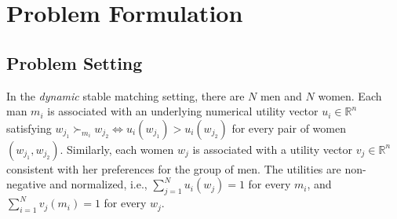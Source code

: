 \section{Problem Formulation}
\subsection{Problem Setting}

In the \textit{dynamic} stable matching setting, there are $N$ men and $N$ women. Each man $m_i$ is associated with an underlying numerical utility vector $u_i \in \mathbb{R}^n$ satisfying $w_{j_1} \succ_{m_i} w_{j_2} \Leftrightarrow u_i(w_{j_1}) > u_i(w_{j_2})$ for every pair of women $(w_{j_1}, w_{j_2})$. Similarly, each women $w_j$ is associated with a utility vector $v_j \in \mathbb{R}^n$ consistent with her preferences for the group of men. The utilities are non-negative and normalized, i.e., $\sum_{j=1}^N{u_i(w_j)} = 1$ for every $m_i$, and $\sum_{i=1}^N{v_j(m_i)} = 1$ for every $w_j$.

